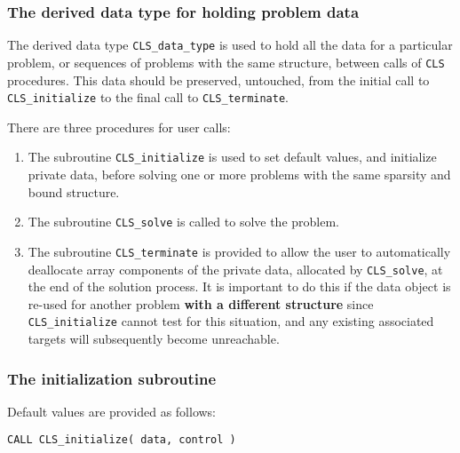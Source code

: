 \documentclass{galahad}
\newcommand{\packagename}{CLS}
\begin{document}
\subsubsection{The derived data type for holding problem data}\label{typedata}
The derived data type 
{\tt \packagename\_data\_type} 
is used to hold all the data for a particular problem,
or sequences of problems with the same structure, between calls of 
{\tt \packagename} procedures. 
This data should be preserved, untouched, from the initial call to 
{\tt \packagename\_initialize}
to the final call to
{\tt \packagename\_terminate}.


\galarguments
There are three procedures for user calls:

\begin{enumerate}
\item The subroutine 
      {\tt \packagename\_initialize} 
      is used to set default values, and initialize private data, 
      before solving one or more problems with the
      same sparsity and bound structure.
\item The subroutine 
      {\tt \packagename\_solve} 
      is called to solve the problem.
\item The subroutine 
      {\tt \packagename\_terminate} 
      is provided to allow the user to automatically deallocate array 
       components of the private data, allocated by 
       {\tt \packagename\_solve}, 
       at the end of the solution process. 
       It is important to do this if the data object is re-used for another 
       problem {\bf with a different structure}
       since {\tt \packagename\_initialize} cannot test for this situation, 
       and any existing associated targets will subsequently become unreachable.
\end{enumerate}


\subsubsection{The initialization subroutine}\label{subinit}
 Default values are provided as follows:
\vspace*{1mm}

\hspace{8mm}
{\tt CALL \packagename\_initialize( data, control )}
\end{document}
